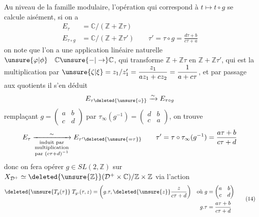 Au niveau de la famille modulaire, l'opération qui correspond à $t\longmapsto t\circ g$ se calcule aisément, si on a
\[
\begin{aligned}
E_\tau &=\mathbb C/(\mathbb Z+\mathbb Z\tau)\\
E_{\tau\circ g}&=\mathbb C/(\mathbb Z+\mathbb Z\tau')\qquad \tau'=\tau\circ g=\frac{d\tau+b}{c\tau+a}
\end{aligned}
\]
on note que l'on a une application  linéaire naturelle $\unsure{\varphi|\phi}\quad\mathbb C\unsure{-|\to}\mathbb C$, qui transforme $\mathbb Z+\mathbb Z\tau$ en $\mathbb Z+\mathbb Z\tau'$, qui est la multiplication par $\unsure{\zeta|\xi}=z_1/z'_1=\dfrac{z_1}{az_1+cz_2}=\dfrac{1}{a+c\tau}$,
et par passage aux quotients il s'en déduit
\[
E_{\tau\deleted{\unsure{\circ}}}\xrightarrow{\sim}E_{\tau\circ g}
\]
remplaçant $g=\begin{pmatrix}a&b\\c&d\end{pmatrix}$ par $\tau_\infty(g^{-1})=\begin{pmatrix}d&b\\c&a\end{pmatrix}$, on trouve
\[
E_\tau\xrightarrow[\substack{\text{induit par}\\\text{multiplication}\\\text{par }(c\tau+d)^{-1}}]{\sim}E_{\tau'\deleted{\unsure{=\tau}}}
\qquad \tau'=\tau\circ\tau_\infty(g^{-1})=\frac{a\tau+b}{c\tau+d}
\]
donc on fera opérer $g\in SL(2,\mathbb Z)$  sur $X_{\mathcal D^+}\simeq\deleted{\unsure{\mathbb Z}}(\mathcal D^+\times\mathbb C)/\mathbb Z\times\mathbb Z$ via l'action
\[
\begin{aligned}
\deleted{\unsure{T_g(\tau}}\;T_g.(\tau,z)&=\left(g.\tau,\deleted{\unsure{z}}\frac{z}{c\tau+d}\right)
&\text{où }g&=\begin{pmatrix}a&b\\c&d\end{pmatrix}\\
&&g.\tau&=\frac{a\tau+b}{c\tau+d}
\end{aligned}\tag*{(14)}
\]
